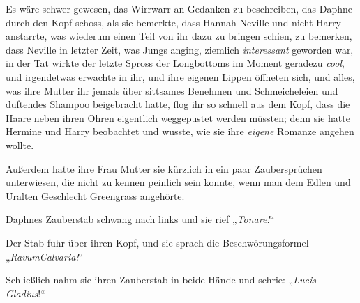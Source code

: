 Es wäre schwer gewesen, das Wirrwarr an Gedanken zu beschreiben, das Daphne durch den Kopf schoss, als sie bemerkte, dass Hannah Neville und nicht Harry anstarrte, was wiederum einen Teil von ihr dazu zu bringen schien, zu bemerken, dass Neville in letzter Zeit, was Jungs anging, ziemlich \emph{interessant} geworden war, in der Tat wirkte der letzte Spross der Longbottoms im Moment geradezu \emph{cool}, und irgendetwas erwachte in ihr, und ihre eigenen Lippen öffneten sich, und alles, was ihre Mutter ihr jemals über sittsames Benehmen und Schmeicheleien und duftendes Shampoo beigebracht hatte, flog ihr so schnell aus dem Kopf, dass die Haare neben ihren Ohren eigentlich weggepustet werden müssten; denn sie hatte Hermine und Harry beobachtet und wusste, wie sie ihre \emph{eigene} Romanze angehen wollte.

Außerdem hatte ihre Frau Mutter sie kürzlich in ein paar Zaubersprüchen unterwiesen, die nicht zu kennen peinlich sein konnte, wenn man dem Edlen und Uralten Geschlecht Greengrass angehörte.

Daphnes Zauberstab schwang nach links und sie rief „\emph{Tonare!}“

Der Stab fuhr über ihren Kopf, und sie sprach die Beschwörungsformel „\emph{RavumCalvaria!}“

Schließlich nahm sie ihren Zauberstab in beide Hände und schrie: „\emph{Lucis} \emph{Gladius}!“

